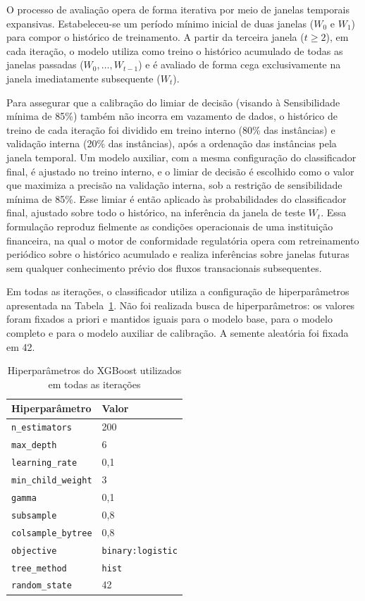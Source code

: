 \documentclass[titlepage,a4paper,oneside,onecolumn,12pt]{report}
\begin{document}
O processo de avaliação opera de forma iterativa por meio de janelas temporais expansivas. Estabeleceu-se um período mínimo inicial de duas janelas ($W_0$ e $W_1$) para compor o histórico de treinamento. A partir da terceira janela ($t \ge 2$), em cada iteração, o modelo utiliza como treino o histórico acumulado de todas as janelas passadas ($W_0, \dots, W_{t-1}$) e é avaliado de forma cega exclusivamente na janela imediatamente subsequente ($W_t$).

Para assegurar que a calibração do limiar de decisão (visando à Sensibilidade mínima de 85\%) também não incorra em vazamento de dados, o histórico de treino de cada iteração foi dividido em treino interno (80\% das instâncias) e validação interna (20\% das instâncias), após a ordenação das instâncias pela janela temporal. Um modelo auxiliar, com a mesma configuração do classificador final, é ajustado no treino interno, e o limiar de decisão é escolhido como o valor que maximiza a precisão na validação interna, sob a restrição de sensibilidade mínima de 85\%. Esse limiar é então aplicado às probabilidades do classificador final, ajustado sobre todo o histórico, na inferência da janela de teste $W_t$. Essa formulação reproduz fielmente as condições operacionais de uma instituição financeira, na qual o motor de conformidade regulatória opera com retreinamento periódico sobre o histórico acumulado e realiza inferências sobre janelas futuras sem qualquer conhecimento prévio dos fluxos transacionais subsequentes.

Em todas as iterações, o classificador utiliza a configuração de hiperparâmetros apresentada na Tabela~\ref{tab:hiperparametros}. Não foi realizada busca de hiperparâmetros: os valores foram fixados a priori e mantidos iguais para o modelo base, para o modelo completo e para o modelo auxiliar de calibração. A semente aleatória foi fixada em 42.

\begin{table}[htbp]
    \centering
    \caption{Hiperparâmetros do XGBoost utilizados em todas as iterações}
    \label{tab:hiperparametros}
    \begin{tabular}{ll}
        \hline
        \textbf{Hiperparâmetro} & \textbf{Valor} \\
        \hline
        \texttt{n\_estimators} & 200 \\
        \texttt{max\_depth} & 6 \\
        \texttt{learning\_rate} & 0{,}1 \\
        \texttt{min\_child\_weight} & 3 \\
        \texttt{gamma} & 0{,}1 \\
        \texttt{subsample} & 0{,}8 \\
        \texttt{colsample\_bytree} & 0{,}8 \\
        \texttt{objective} & \texttt{binary:logistic} \\
        \texttt{tree\_method} & \texttt{hist} \\
        \texttt{random\_state} & 42 \\
        \hline
    \end{tabular}
\end{table}
\end{document}
